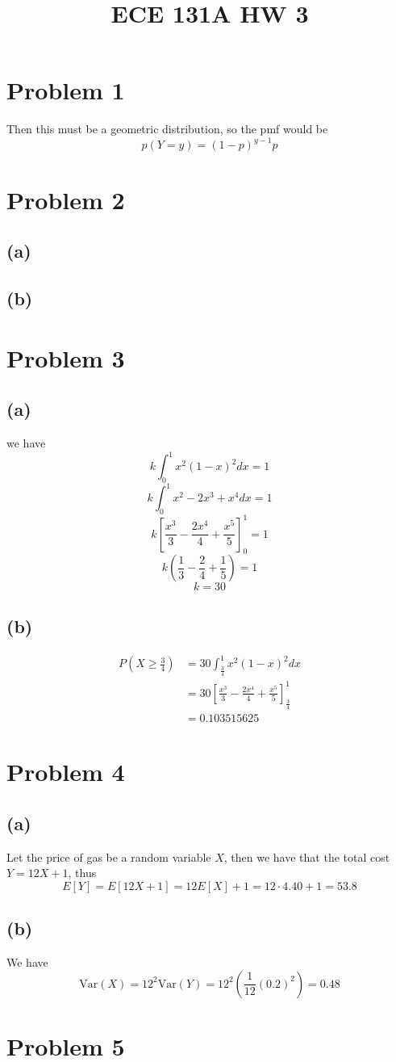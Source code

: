 
\title{ECE 131A HW 3}

\maketitle
\section*{Problem 1}
Then this must be a geometric distribution, so the pmf would be 
$$p(Y=y)=(1-p)^{y-1}p$$
\section*{Problem 2}
\subsection*{(a)}
\subsection*{(b)}
\section*{Problem 3}
\subsection*{(a)}
we have
$$k\int_{0}^{1}x^2(1-x)^2dx=1$$
$$k\int_{0}^{1}x^2-2x^3+x^4dx=1$$
$$k\left[\frac{x^3}{3}-\frac{2x^4}{4}+\frac{x^5}{5}\right]_{0}^{1}=1$$
$$k\left(\frac{1}{3}-\frac{2}{4}+\frac{1}{5}\right)=1$$
$$\boxed{k=30}$$
\subsection*{(b)}
\begin{align*}
    P(X\geq \frac{3}{4})&=30\int_{\frac{3}{4}}^{1}x^2(1-x)^2dx\\
    &=30\left[\frac{x^3}{3}-\frac{2x^4}{4}+\frac{x^5}{5}\right]_{\frac{3}{4}}^{1}\\
    &=\boxed{0.103515625}
\end{align*}
\section*{Problem 4}
\subsection*{(a)}
Let the price of gas be a random variable $X$, then we have that the
total cost $Y=12X+1$, thus
$$E[Y]=E[12X+1]=12E[X]+1=12\cdot4.40+1=\boxed{53.8}$$
\subsection*{(b)}
We have
$$\text{Var}(X)=12^2\text{Var}(Y)=12^2\left(\frac{1}{12}(0.2)^2\right)=0.48$$
\section*{Problem 5}


